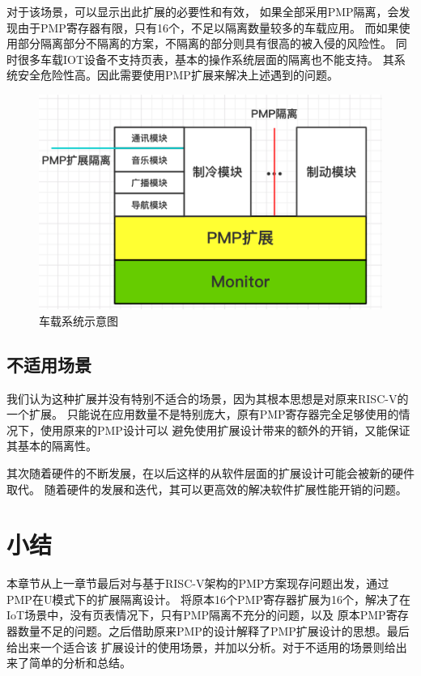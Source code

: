 对于该场景，可以显示出此扩展的必要性和有效，
如果全部采用PMP隔离，会发现由于PMP寄存器有限，只有16个，不足以隔离数量较多的车载应用。
而如果使用部分隔离部分不隔离的方案，不隔离的部分则具有很高的被入侵的风险性。
同时很多车载IOT设备不支持页表，基本的操作系统层面的隔离也不能支持。
其系统安全危险性高。因此需要使用PMP扩展来解决上述遇到的问题。
\begin{figure}
    \centering
    \includegraphics[scale=0.45]{Figures/extend/car.png}
    \decoRule
    \caption{车载系统示意图}
    \label{fig:car}
\end{figure}

\subsection{不适用场景}
我们认为这种扩展并没有特别不适合的场景，因为其根本思想是对原来RISC-V的一个扩展。
只能说在应用数量不是特别庞大，原有PMP寄存器完全足够使用的情况下，使用原来的PMP设计可以
避免使用扩展设计带来的额外的开销，又能保证其基本的隔离性。

其次随着硬件的不断发展，在以后这样的从软件层面的扩展设计可能会被新的硬件取代。
随着硬件的发展和迭代，其可以更高效的解决软件扩展性能开销的问题。

\section{小结}
本章节从上一章节最后对与基于RISC-V架构的PMP方案现存问题出发，通过PMP在U模式下的扩展隔离设计。
将原本16个PMP寄存器扩展为16个，解决了在IoT场景中，没有页表情况下，只有PMP隔离不充分的问题，以及
原本PMP寄存器数量不足的问题。之后借助原来PMP的设计解释了PMP扩展设计的思想。最后给出来一个适合该
扩展设计的使用场景，并加以分析。对于不适用的场景则给出来了简单的分析和总结。